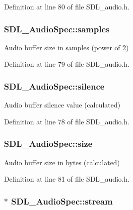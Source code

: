 Definition at line 80 of file S\+D\+L\+\_\+audio.\+h.

\hypertarget{struct_s_d_l___audio_spec_a2cdf5e885808c10bfa2810b706e69f95}{}
\subsubsection[{samples}]{ S\+D\+L\+\_\+\+Audio\+Spec\+::samples}\label{struct_s_d_l___audio_spec_a2cdf5e885808c10bfa2810b706e69f95}
Audio buffer size in samples (power of 2) 

Definition at line 79 of file S\+D\+L\+\_\+audio.\+h.

\hypertarget{struct_s_d_l___audio_spec_addc462c8a806e6c122eccf63482048f6}{}
\subsubsection[{silence}]{ S\+D\+L\+\_\+\+Audio\+Spec\+::silence}\label{struct_s_d_l___audio_spec_addc462c8a806e6c122eccf63482048f6}
Audio buffer silence value (calculated) 

Definition at line 78 of file S\+D\+L\+\_\+audio.\+h.

\hypertarget{struct_s_d_l___audio_spec_a154cf44743ecec78c36dc6c827dd2fdb}{}
\subsubsection[{size}]{ S\+D\+L\+\_\+\+Audio\+Spec\+::size}\label{struct_s_d_l___audio_spec_a154cf44743ecec78c36dc6c827dd2fdb}
Audio buffer size in bytes (calculated) 

Definition at line 81 of file S\+D\+L\+\_\+audio.\+h.

\hypertarget{struct_s_d_l___audio_spec_aacbebdd2696a8abec7ac5bed473eb5c5}{}
\subsubsection[{stream}]{$\ast$ S\+D\+L\+\_\+\+Audio\+Spec\+::stream}\label{struct_s_d_l___audio_spec_aacbebdd2696a8abec7ac5bed473eb5c5}


